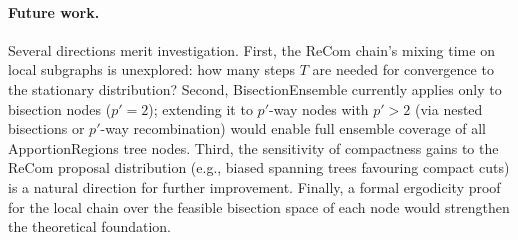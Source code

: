 \paragraph{Future work.}
Several directions merit investigation. First, the ReCom chain's mixing time
on local subgraphs is unexplored: how many steps $T$ are needed for convergence
to the stationary distribution? Second, BisectionEnsemble currently applies only
to bisection nodes ($p' = 2$); extending it to $p'$-way nodes with $p' > 2$
(via nested bisections or $p'$-way recombination) would enable full ensemble
coverage of all ApportionRegions tree nodes. Third, the sensitivity of compactness
gains to the ReCom proposal distribution (e.g., biased spanning trees favouring
compact cuts) is a natural direction for further improvement. Finally, a formal
ergodicity proof for the local chain over the feasible bisection space of each
node would strengthen the theoretical foundation.
